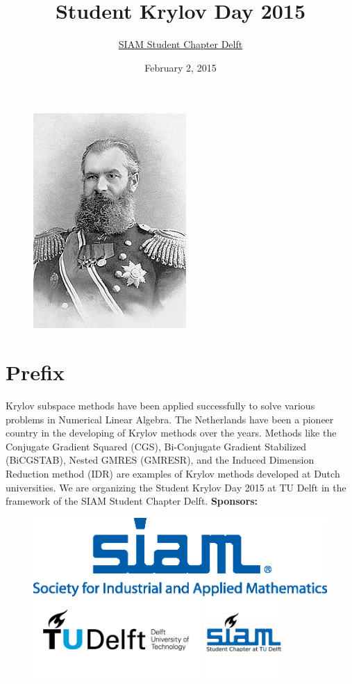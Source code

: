 \documentclass{article}
\title{\bf Student Krylov Day 2015}
\author{\href{http://sscdelft.github.io/activities/2015/02/02/krylov-day.html}{SIAM Student Chapter Delft}}
\date{February 2, 2015}
\begin{document}
\maketitle
\begin{figure}[h]
 \centering
 \includegraphics{220px-Alexey_Krylov_1910s.JPG}
\end{figure}

\section*{Prefix}
Krylov subspace methods have been applied successfully to solve various problems 
in Numerical Linear Algebra. The Netherlands have been a pioneer country in the developing of Krylov methods over the years.
Methods like the Conjugate Gradient Squared (CGS), Bi-Conjugate Gradient Stabilized (BiCGSTAB), Nested GMRES (GMRESR), and the Induced Dimension Reduction method (IDR) are examples of Krylov methods developed at Dutch universities. 
We are organizing the Student Krylov Day 2015 at TU Delft in the framework of the SIAM Student Chapter Delft. 
\newpage
\thispagestyle{empty}
\null
\vspace{10cm}
\textbf{Sponsors:}
\begin{figure}[h]
 \includegraphics[height=3cm]{Society_for_Industrial_and_Applied_Mathematics_(logo).png} \hfill
  \includegraphics[height=3cm]{TU_d_line_P1_color-TU-Delft.png} \hfill
   \includegraphics[height=3cm]{SIAMSC_Delft.png}
\end{figure}
\end{document}
